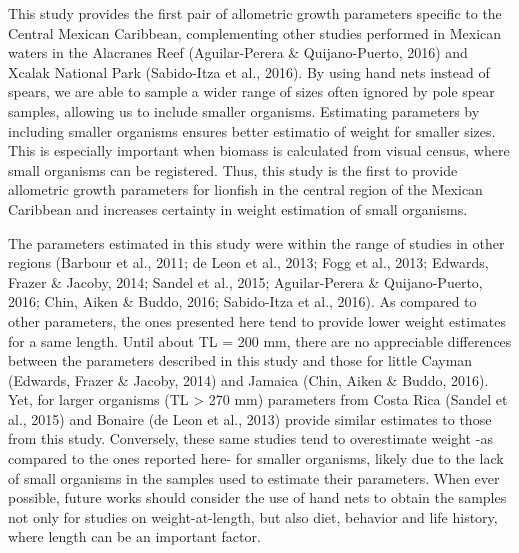 \documentclass[12pt,]{article}
\begin{document}
This study provides the first pair of allometric growth parameters
specific to the Central Mexican Caribbean, complementing other studies
performed in Mexican waters in the Alacranes Reef (Aguilar-Perera \&
Quijano-Puerto, 2016) and Xcalak National Park (Sabido-Itza et al.,
2016). By using hand nets instead of spears, we are able to sample a
wider range of sizes often ignored by pole spear samples, allowing us to
include smaller organisms. Estimating parameters by including smaller
organisms ensures better estimatio of weight for smaller sizes. This is
especially important when biomass is calculated from visual census,
where small organisms can be registered. Thus, this study is the first
to provide allometric growth parameters for lionfish in the central
region of the Mexican Caribbean and increases certainty in weight
estimation of small organisms.

The parameters estimated in this study were within the range of studies
in other regions (Barbour et al., 2011; de Leon et al., 2013; Fogg et
al., 2013; Edwards, Frazer \& Jacoby, 2014; Sandel et al., 2015;
Aguilar-Perera \& Quijano-Puerto, 2016; Chin, Aiken \& Buddo, 2016;
Sabido-Itza et al., 2016). As compared to other parameters, the ones
presented here tend to provide lower weight estimates for a same length.
Until about TL = 200 mm, there are no appreciable differences between
the parameters described in this study and those for little Cayman
(Edwards, Frazer \& Jacoby, 2014) and Jamaica (Chin, Aiken \& Buddo,
2016). Yet, for larger organisms (TL \textgreater{} 270 mm) parameters
from Costa Rica (Sandel et al., 2015) and Bonaire (de Leon et al., 2013)
provide similar estimates to those from this study. Conversely, these
same studies tend to overestimate weight -as compared to the ones
reported here- for smaller organisms, likely due to the lack of small
organisms in the samples used to estimate their parameters. When ever
possible, future works should consider the use of hand nets to obtain
the samples not only for studies on weight-at-length, but also diet,
behavior and life history, where length can be an important factor.
\end{document}
